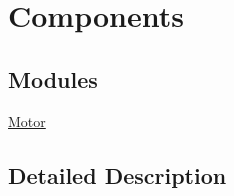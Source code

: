 \hypertarget{group___components}{}\section{Components}
\label{group___components}
\subsection*{Modules}
\begin{DoxyCompactItemize}
\item 
\mbox{\hyperlink{group___motor}{Motor}}
\end{DoxyCompactItemize}


\subsection{Detailed Description}

